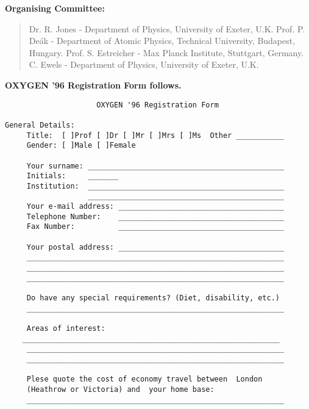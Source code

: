 {{\centering{
------------------------------------------------------------------------------}}

{\large{\bf Organising Committee:}}

\begin{quotation} \noindent
     Dr. R. Jones - Department of Physics, University of Exeter, U.K.
     Prof. P. De\'ak - Department of Atomic Physics, Technical University,
     Budapest, Hungary.
     Prof. S. Estreicher - Max Planck Institute, Stuttgart, Germany.
     C. Ewels - Department of Physics, University of Exeter, U.K.
\end{quotation}

{\centering{
------------------------------------------------------------------------------}}

\begin{center}
{\large{\bf OXYGEN '96 Registration Form follows.}}
\end{center}

\newpage
\begin{verbatim}
                     OXYGEN '96 Registration Form

General Details:
     Title:  [ ]Prof [ ]Dr [ ]Mr [ ]Mrs [ ]Ms  Other ___________
     Gender: [ ]Male [ ]Female

     Your surname: _____________________________________________  
     Initials:     _______
     Institution:  _____________________________________________
                   _____________________________________________
     Your e-mail address: ______________________________________
     Telephone Number:    ______________________________________
     Fax Number:          ______________________________________

     Your postal address: ______________________________________
     ___________________________________________________________
     ___________________________________________________________
     ___________________________________________________________

     Do have any special requirements? (Diet, disability, etc.)
     ___________________________________________________________

     Areas of interest:
    ___________________________________________________________
     ___________________________________________________________
     ___________________________________________________________

     Plese quote the cost of economy travel between  London
     (Heathrow or Victoria) and  your home base:
     ___________________________________________________________


\end{verbatim}}

